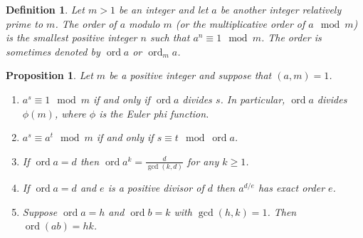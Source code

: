 \documentclass[12pt]{article}
\newtheorem*{defn}{Definition}
\newtheorem*{prop}{Proposition}
\theoremstyle{definition}
\newcommand{\ord}{\operatorname{ord}}
\begin{document}
\begin{defn}
Let $m>1$ be an integer and let $a$ be another integer relatively prime to $m$. The order of $a$ modulo $m$ (or the multiplicative order of $a \mod m$) is the smallest positive integer $n$ such that $a^n\equiv 1 \mod m$. The order is sometimes denoted by $\operatorname{ord} a$ or $\operatorname{ord}_m a$.
\end{defn}

\begin{prop}
Let $m$ be a positive integer and suppose that $(a,m)=1$.
\begin{enumerate}
\item $a^s\equiv 1 \mod m$ if and only if $\ord a$ divides $s$. In particular, $\ord a$ divides $\phi(m)$, where $\phi$ is the Euler phi function.

\item $a^s\equiv a^t \mod m$ if and only if $s\equiv t \mod \ord a$.

\item If $\ord a =d$ then $\displaystyle \ord a^k =\frac{d}{\gcd(k,d)}$ for any $k\geq 1$.

\item If $\ord a =d$ and $e$ is a positive divisor of $d$ then $a^{d/e}$ has exact order $e$. 

\item Suppose $\ord a=h$ and $\ord b = k$ with $\gcd(h,k)=1$. Then $\ord (ab)=hk$.
\end{enumerate}
\end{prop}
\end{document}
